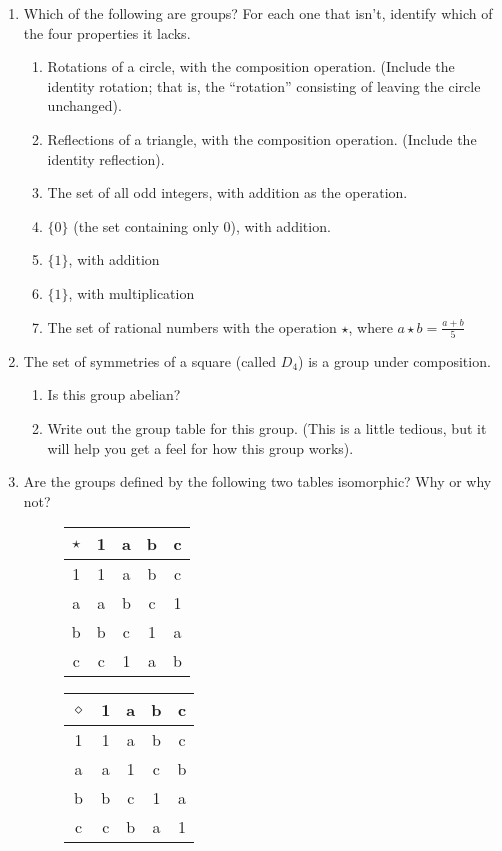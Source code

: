 \documentclass[10pt, letterpaper]{article}
\begin{document}
\begin{enumerate}

\item Which of the following are groups? For each one that isn't,
  identify which of the four properties it lacks.

\begin{enumerate}

\item Rotations of a circle, with the composition operation. (Include
  the identity rotation; that is, the ``rotation'' consisting of
  leaving the circle unchanged).

\item Reflections of a triangle, with the composition
  operation. (Include the identity reflection). 

\item The set of all odd integers, with addition as the operation.

\item $\{0\}$ (the set containing only $0$), with addition.

\item $\{1\}$, with addition

\item $\{1\}$, with multiplication

\item The set of rational numbers with the operation $\star$, where
  $a \star b = \frac{a + b}{5}$
\end{enumerate}

\item The set of symmetries of a square (called $D_4$) is a group
  under composition.
  \begin{enumerate}
    \item Is this group abelian?

    \item Write out the group table for this group. (This is a little
      tedious, but it will help you get a feel for how this group
      works).
  \end{enumerate}

\item Are the groups defined by the following two tables isomorphic?
  Why or why not?

\begin{figure}[h]
\centering
\begin{tabular} { c|cccc }
 $\star$ & 1 & a & b & c \\ \hline
 1 & 1 & a & b & c \\
 a & a & b & c & 1 \\
 b & b & c & 1 & a \\
 c & c & 1 & a & b
\end{tabular}
\qquad
\begin{tabular}{c|cccc}
 $\diamond$ & 1 & a & b & c \\ \hline
1 & 1 & a & b & c \\
a & a & 1 & c & b \\
b & b & c & 1 & a \\
c & c & b & a & 1
\end{tabular}
\end{figure}


\end{enumerate}
\end{document}

